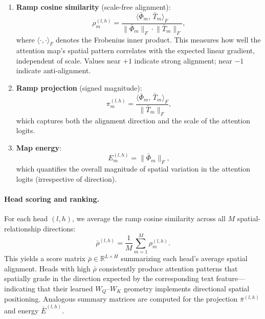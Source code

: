 \begin{enumerate}
    \item \textbf{Ramp cosine similarity} (scale-free alignment):
    \begin{equation}
        \rho_m^{(l,h)} = \frac{\langle \bar{\Phi}_m,\, \bar{T}_m \rangle_F}{\lVert \bar{\Phi}_m \rVert_F \cdot \lVert \bar{T}_m \rVert_F},
        \label{eq:ramp-cosine}
    \end{equation}
    where $\langle \cdot, \cdot \rangle_F$ denotes the Frobenius inner product. This measures how well the attention map's spatial pattern correlates with the expected linear gradient, independent of scale. Values near $+1$ indicate strong alignment; near $-1$ indicate anti-alignment.

    \item \textbf{Ramp projection} (signed magnitude):
    \begin{equation}
        \pi_m^{(l,h)} = \frac{\langle \bar{\Phi}_m,\, \bar{T}_m \rangle_F}{\lVert \bar{T}_m \rVert_F},
    \end{equation}
    which captures both the alignment direction and the scale of the attention logits.

    \item \textbf{Map energy}:
    \begin{equation}
        E_m^{(l,h)} = \lVert \bar{\Phi}_m \rVert_F,
    \end{equation}
    which quantifies the overall magnitude of spatial variation in the attention logits (irrespective of direction).
\end{enumerate}

\paragraph{Head scoring and ranking.}
For each head $(l, h)$, we average the ramp cosine similarity across all $M$ spatial-relationship directions:
\begin{equation}
    \bar{\rho}^{(l,h)} = \frac{1}{M} \sum_{m=1}^{M} \rho_m^{(l,h)}.
    \label{eq:head-score}
\end{equation}
This yields a score matrix $\bar{\rho} \in \mathbb{R}^{L \times H}$ summarizing each head's average spatial alignment. Heads with high $\bar{\rho}$ consistently produce attention patterns that spatially grade in the direction expected by the corresponding text feature---indicating that their learned $W_Q$--$W_K$ geometry implements directional spatial positioning. Analogous summary matrices are computed for the projection $\bar{\pi}^{(l,h)}$ and energy $\bar{E}^{(l,h)}$.

